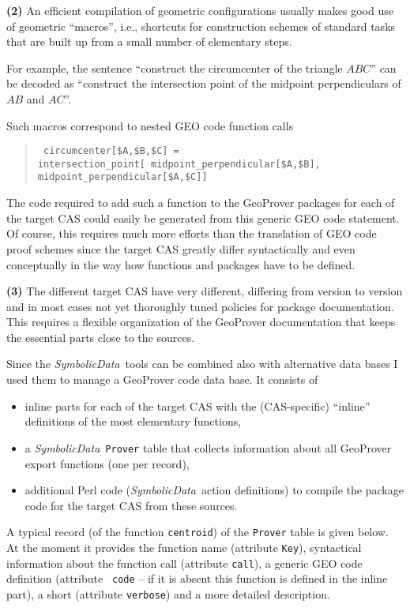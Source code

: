 \documentclass[11pt]{article}
\newcommand{\SD}{{\it Symbo\-lic\-Data}}
\newcommand{\gf}[1]{{\tt #1}\/}
\begin{document}
{\bf (2)} An efficient compilation of geometric configurations
usually makes good use of geometric ``macros'', i.e., shortcuts
for construction schemes of standard tasks that are built up from a
small number of elementary steps.

For example, the sentence ``construct the circumcenter of the
triangle $ABC$'' can be decoded as ``construct the intersection
point of the midpoint perpendiculars of $AB$ and $AC$''.

Such macros correspond to nested GEO code function calls
\begin{quote}\tt
circumcenter[\$A,\$B,\$C] =\\\hspace*{12pt}
intersection\_point[\,midpoint\_perpendicular[\$A,\$B],
\\\hspace*{24pt} midpoint\_perpendicular[\$A,\$C]]
\end{quote}

The code required to add such a function to the GeoProver packages for
each of the target CAS could easily be generated from this generic GEO
code statement. Of course, this requires much more efforts than the
translation of GEO code proof schemes since the target CAS greatly
differ syntactically and even conceptually in the way how functions
and packages have to be defined.
\medskip

{\bf (3)} The different target CAS have very different, differing from
version to version and in most cases not yet thoroughly tuned policies
for package documentation.  This requires a flexible organization of
the GeoProver documentation that keeps the essential parts close to
the sources.
\medskip

Since the \SD\ tools can be combined also with alternative data
bases I used them to manage a GeoProver code data base.  It
consists of
\begin{itemize}\itemsep-2pt
\item inline parts for each of the target CAS with the
(CAS-specific) ``inline'' definitions of the most elementary
functions,
\item a \SD\ {\tt Prover} table that collects information about
all GeoProver export functions (one per record),
\item additional Perl code (\SD\ action definitions) to compile
the package code for the target CAS from these sources.
\end{itemize}

A typical record (of the function \gf{centroid}) of the {\tt Prover}
table is given below. At the moment it provides the function name
(attribute {\tt Key}), syntactical information about the function call
(attribute {\tt call}), a generic GEO code definition (attribute {\tt
code} -- if it is absent this function is defined in the inline part),
a short (attribute {\tt verbose}) and a more detailed description.
\medskip
\end{document}

